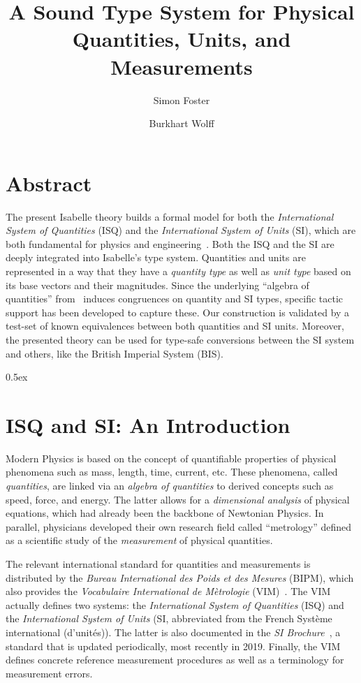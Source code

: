 \documentclass[11pt,a4paper]{book}
\begin{document}
\title{A Sound Type System for Physical \\ Quantities, Units, and Measurements}
\author{Simon Foster \and Burkhart Wolff}

\maketitle

\chapter*{Abstract}
The present Isabelle theory builds a formal model for both the \emph{International System of Quantities}
(ISQ) and the \emph{International System of Units} (SI), which are both fundamental for physics
and engineering~\cite{bipm-jcgm:2012:VIM}. Both the ISQ and the SI are deeply integrated into 
Isabelle's type system. Quantities and units are represented in a way that 
they have a \emph{quantity type} as well as \emph{unit type} based on its base vectors and their 
magnitudes. Since the underlying ``algebra of quantities'' from~\cite{bipm-jcgm:2012:VIM} induces 
congruences on  quantity and SI types, specific tactic support has been developed to capture these.
Our construction is validated by a test-set of known equivalences between both quantities and SI units.
Moreover, the presented theory can be used for type-safe conversions between the SI system and
others, like the British Imperial System (BIS).

\tableofcontents

\parindent 0pt\parskip 0.5ex


\chapter{ISQ and SI: An Introduction}

Modern Physics is based on the concept of quantifiable properties of physical phenomena such 
as mass, length, time, current, etc. These phenomena, called \emph{quantities}, are linked via an 
\emph{algebra of quantities} to derived concepts such as speed, force, and energy. The latter 
allows for a \emph{dimensional analysis} of physical equations, which had already been the 
backbone of Newtonian Physics. In parallel, physicians developed their own research field called 
``metrology'' defined as a scientific study of the \emph{measurement} of physical quantities.

The relevant international standard for quantities and measurements is distributed by the \emph{Bureau International des
  Poids et des Mesures} (BIPM), which also provides the \emph{Vocabulaire International de M\`etrologie}
(VIM)~\cite{bipm-jcgm:2012:VIM}.  The VIM actually defines two systems: the \emph{International System of Quantities}
(ISQ) and the \emph{International System of Units} (SI, abbreviated from the French Syst\`eme international
(d’unit\'es)). The latter is also documented in the \emph{SI Brochure}~\cite{SI-Brochure}, a standard that is updated
periodically, most recently in 2019. Finally, the VIM defines concrete reference measurement procedures as well as a
terminology for measurement errors.
\end{document}
